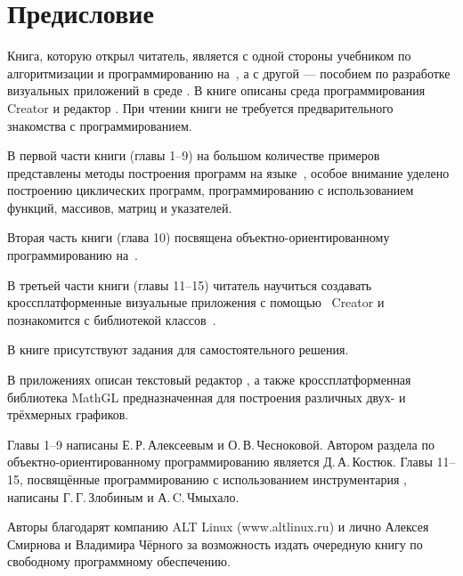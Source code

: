 

\chapter*{Предисловие}
Книга, которую открыл читатель, является с одной стороны учебником по алгоритмизации и программированию на~, а с
другой --- пособием по разработке визуальных приложений в среде . В книге описаны среда программирования~
Creator и редактор . При чтении книги не требуется предварительного знакомства с программированием. 

В первой части книги (главы 1--9) на большом количестве примеров представлены методы построения программ на языке~,
особое внимание уделено построению циклических программ, программированию с использованием функций, массивов, матриц и
указателей. 

Вторая часть книги (глава 10) посвящена объектно-ориентированному программированию на~. 

В третьей части книги (главы 11--15) читатель научиться создавать кроссплатформенные визуальные приложения с помощью~
Creator и познакомится с библиотекой классов~.

В книге присутствуют задания для самостоятельного решения.

В приложениях описан текстовый редактор , а также кросс\-платформенная библиотека MathGL предназначенная для построения
различных двух- и трёхмерных графиков.

Главы 1--9 написаны Е.\,Р.\,Алексеевым и О.\,В.\,Чесноковой. Автором раздела по объектно-ориентированному программированию
является Д.\,А.\,Костюк. Главы 11--15, посвящённые программированию с использованием инструментария , написаны 
Г.\,Г.\,Злобиным и А.\,C.\,Чмыхало.

Авторы благодарят компанию ALT Linux (www.altlinux.ru) и лично Алексея Смирнова и Владимира Чёрного за  возможность
издать очередную книгу по свободному программному обеспечению.

%

